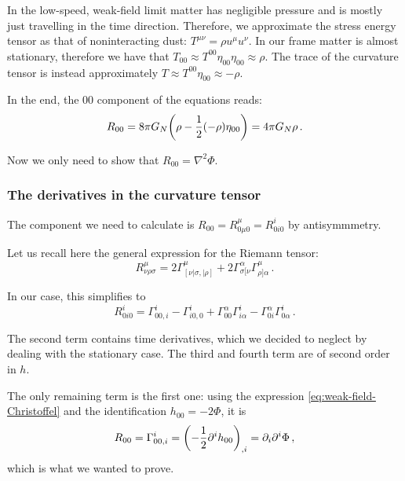 \documentclass[main.tex]{subfiles}
\begin{document}
In the low-speed, weak-field limit matter has negligible pressure and is mostly just travelling in the time direction. Therefore, we approximate the stress energy tensor as that of noninteracting dust: \(T^{\mu \nu } = \rho u^{\mu } u^{\nu }\). In our frame matter is almost stationary, therefore we have that \(T_{00} \approx T^{00} \eta_{00} \eta_{00} \approx \rho\).
The trace of the curvature tensor is instead approximately \(T \approx T^{00 } \eta_{00} \approx - \rho\). 

In the end, the 00 component of the equations reads: 
%
\begin{equation}
  R_{00 } = 8 \pi G_N \qty(\rho - \frac{1}{2} (-\rho) \eta_{00 } ) = 4 \pi G_N \rho 
\,.
\end{equation}
%

Now we only need to show that \(R_{00 } = \nabla^2 \Phi \).

\subsubsection{The derivatives in the curvature tensor}

The component we need to calculate is \(R_{00 } = R^{\mu }_{0 \mu 0} = R^{i}_{0i0}\) by antisymmmetry.

Let us recall here the general expression for the Riemann tensor: 
%
\begin{equation}
  R^{\mu }_{\nu \rho \sigma } =
  2 \Gamma^{\mu }_{[\nu| \sigma, |\rho]} + 2 \Gamma^{\alpha }_{\sigma [\nu} \Gamma^{\mu }_{\rho ] \alpha }
\,.
\end{equation}

In our case, this simplifies to 
%
\begin{equation}
  R^{i}_{0i0} = 
  \Gamma^{i}_{00, i} 
  - \Gamma^{i}_{i0, 0}
  + \Gamma^{\alpha }_{00} \Gamma^{i}_{i \alpha }
  - \Gamma^{\alpha }_{0i} \Gamma^{i}_{0 \alpha }
\,.
\end{equation}
%

The second term contains time derivatives, which we decided to neglect by dealing with the stationary case.
The third and fourth term are of second order in \(h\).

The only remaining term is the first one: using the expression \eqref{eq:weak-field-Christoffel} and the identification \(h_{00} = -2 \Phi \), it is
%
\begin{equation}
  R_{00} = \Gamma^{i}_{00, i} = \qty(-\frac{1}{2}\partial^{i}h_{00})_{,i} = \partial_{i}  \partial^{i} \Phi 
\,,
\end{equation}
%
which is what we wanted to prove.
\end{document}

